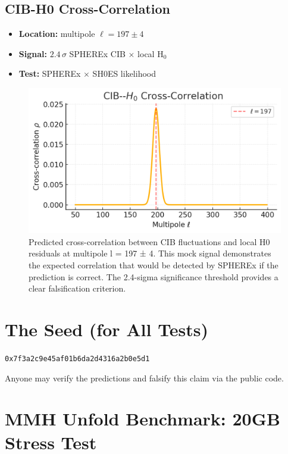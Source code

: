 \documentclass[11pt,a4paper]{article}
\newcommand{\SeedHex}{\texttt{0x7f3a2c9e45af01b6da2d4316a2b0e5d1}}
\begin{document}
\subsection{CIB-H0 Cross-Correlation}
\begin{itemize}
  \item \textbf{Location:} multipole $\ell = 197 \pm 4$
  \item \textbf{Signal:} $2.4\,\sigma$ SPHEREx CIB $\times$ local H$_0$
  \item \textbf{Test:} SPHEREx $\times$ SH0ES likelihood
\end{itemize}
\FloatBarrier
\begin{figure}[htbp]
  \centering
  \includegraphics[width=0.75\linewidth]{figs/cib_h0_corr.png}
  \caption{Predicted cross-correlation between CIB fluctuations and local H0 residuals at multipole l = 197 ± 4. This mock signal demonstrates the expected correlation that would be detected by SPHEREx if the prediction is correct. The 2.4-sigma significance threshold provides a clear falsification criterion.}
  \label{fig:cib_correlation}
\end{figure}
\FloatBarrier

\FloatBarrier
\section{The Seed (for All Tests)}
\begin{center}
\SeedHex
\end{center}
Anyone may verify the predictions and falsify this claim via the public code.

\FloatBarrier
\section{MMH Unfold Benchmark: 20GB Stress Test}
\end{document}
